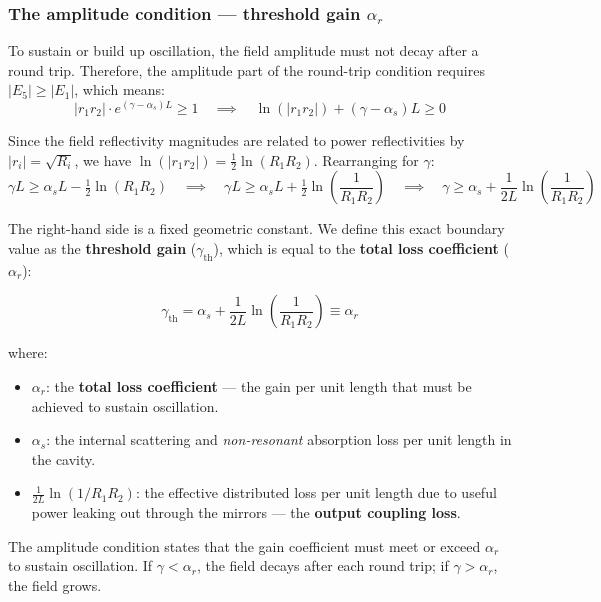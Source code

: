 \subsubsection{The amplitude condition --- threshold gain $\alpha_r$}

To sustain or build up oscillation, the field amplitude must not decay after a round trip. Therefore, the amplitude part of the round-trip condition requires $|E_5| \geq |E_1|$, which means:
\begin{equation*}
    \left|r_1 r_2\right|\cdot e^{(\gamma - \alpha_s)L} \geq 1 \quad \implies \quad \ln(|r_1 r_2|) + (\gamma - \alpha_s)L \geq 0
\end{equation*}

Since the field reflectivity magnitudes are related to power reflectivities by $|r_i| = \sqrt{R_i}$, we have $\ln(|r_1 r_2|) = \tfrac{1}{2}\ln(R_1 R_2)$. Rearranging for $\gamma$:
\begin{equation*}
    \gamma L \geq \alpha_s L - \tfrac{1}{2}\ln(R_1 R_2) \quad\implies\quad \gamma L \geq \alpha_s L + \tfrac{1}{2}\ln\!\left(\frac{1}{R_1 R_2}\right) \quad\implies\quad     \gamma \geq \alpha_s + \frac{1}{2L}\ln\!\left(\frac{1}{R_1 R_2}\right)
\end{equation*}

The right-hand side is a fixed geometric constant. We define this exact boundary value as the \textbf{threshold gain} ($\gamma_{\text{th}}$), which is equal to the \textbf{total loss coefficient} ($\alpha_r$):
\begin{keyresult}
    \begin{equation}
        \gamma_{\text{th}} = \alpha_s + \frac{1}{2L}\ln\!\left(\frac{1}{R_1 R_2}\right) \equiv \alpha_r
    \end{equation}
\end{keyresult}
where:
\begin{itemize}
    \item $\alpha_r$: the \textbf{total loss coefficient} --- the gain per unit length that must be achieved to sustain oscillation.
    \item $\alpha_s$: the internal scattering and \textit{non-resonant} absorption loss per unit length in the cavity.
    \item $\frac{1}{2L}\ln(1/R_1 R_2)$: the effective distributed loss per unit length due to useful power leaking out through the mirrors --- the \textbf{output coupling loss}.
\end{itemize}

The amplitude condition states that the gain coefficient must meet or exceed $\alpha_r$ to sustain oscillation. If $\gamma < \alpha_r$, the field decays after each round trip; if $\gamma > \alpha_r$, the field grows.

